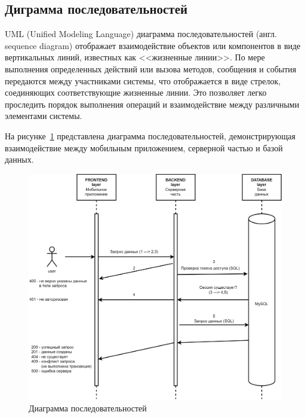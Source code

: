 \subsection*{Диграмма последовательностей}




UML (Unified Modeling Language) диаграмма последовательностей (англ. sequence diagram) отображает
взаимодействие объектов или компонентов в виде вертикальных линий, известных как <<жизненные линии>>.
По мере выполнения определенных действий или вызова методов,
сообщения и события передаются между участниками системы,
что отображается в виде стрелок, соединяющих соответствующие жизненные линии.
Это позволяет легко проследить порядок выполнения операций и взаимодействие между различными элементами системы.

На рисунке~\ref{fig:UML_sequence_diagram} представлена диаграмма последовательностей,
демонстрирующая взаимодействие между мобильным приложением, серверной частью и базой данных.

\begin{figure}[!htb]
    \centering

    \includegraphics[width=14cm]
    {images/UML/sequence/sequence.png}

    \caption{Диаграмма последовательностей}

    \label{fig:UML_sequence_diagram}
\end{figure}

